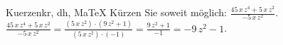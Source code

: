 \begin{MAufgabe}{Kuerzen}{kr, dh, MaTeX}
K\"urzen Sie soweit m\"oglich: $\frac{45\, x\, z^4 + 5\, x\, z^2}{- 5\, x\, z^2}$.\\ 
\ifLsg\MLoesung
\quad $\frac{45\, x\, z^4 + 5\, x\, z^2}{- 5\, x\, z^2}=\frac{(5\, x\, z^2)\cdot(9\, z^2 + 1)}{(5\, x\, z^2)\cdot(-1)}=\frac{9\, z^2 + 1}{-1}= - 9\, z^2 - 1$.\else\relax\fi
 \end{MAufgabe}